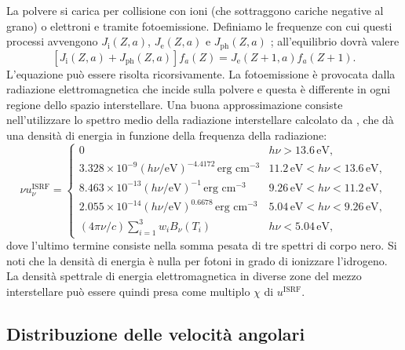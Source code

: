 La polvere si carica per collisione con ioni (che sottraggono cariche negative al grano) o elettroni e tramite fotoemissione. Definiamo le frequenze con cui questi processi avvengono $J_{\mathrm{i}}(Z,a)$, $J_{\mathrm{e}}(Z,a)$ e $J_{\mathrm{ph}}(Z,a)$ \parencite{WD01b,DS}; all'equilibrio dovrà valere
\begin{equation}
\label{charge}
[ J_{\mathrm{i}}(Z,a) + J_{\mathrm{ph}}(Z,a) ] f_a(Z) = J_{\mathrm{e}}(Z+1,a) f_a(Z+1).
\end{equation}
L'equazione può essere risolta ricorsivamente.
La fotoemissione è provocata dalla radiazione elettromagnetica che incide sulla polvere e questa è differente in ogni regione dello spazio interstellare. Una buona approssimazione consiste nell'utilizzare lo spettro medio della radiazione interstellare calcolato da \textcite{MMP}, che dà una densità di energia in funzione della frequenza della radiazione:
\begin{equation}
\label{u}
\nu u^{\mathrm{ISRF}}_\nu =
\begin{cases}
0 & h\nu > 13.6 \,\text{eV}, \\
3.328 \times 10^{-9} (h\nu/\text{eV})^{-4.4172} \,\text{erg cm}^{-3} & 11.2 \,\text{eV} < h\nu < 13.6 \,\text{eV},\\
8.463 \times 10^{-13} (h\nu/\text{eV})^{-1} \,\text{erg cm}^{-3} & 9.26 \,\text{eV} < h\nu < 11.2 \,\text{eV},\\
2.055 \times 10^{-14} (h\nu/\text{eV})^{0.6678} \,\text{erg cm}^{-3} & 5.04 \,\text{eV} < h\nu < 9.26 \,\text{eV},\\
(4\pi\nu/c) \sum_{i=1}^{3}w_i B_\nu(T_i) & h\nu < 5.04 \,\text{eV},
\end{cases}
\end{equation}
dove l'ultimo termine consiste nella somma pesata di tre spettri di corpo nero. Si noti che la densità di energia è nulla per fotoni in grado di ionizzare l'idrogeno.
La densità spettrale di energia elettromagnetica in diverse zone del mezzo interstellare può essere quindi presa come multiplo $\chi$ di $u^{\mathrm{ISRF}}$.

\subsection{Distribuzione delle velocità angolari}
\label{f}

